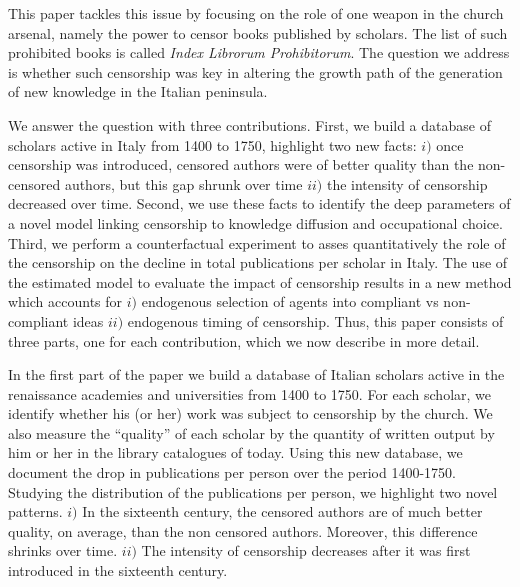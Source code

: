 \documentclass[12pt]{article}
\begin{document}
This paper tackles this issue by focusing on the role of one weapon in the church arsenal, namely the power to censor books published by scholars. The list of such prohibited books is called {\em Index Librorum Prohibitorum}. The question we address is whether such censorship was key in altering the growth path of the generation of new knowledge in the Italian peninsula.

We answer the question with three contributions. First, we build a database of scholars active in Italy from 1400 to 1750, highlight two new facts: $i)$ once censorship was introduced, censored authors were of better quality than the non-censored authors, but this gap shrunk over time $ii)$ the intensity of censorship decreased over time. Second, we use these facts to identify the deep parameters of a novel model linking censorship to knowledge diffusion and occupational choice. Third, we perform a counterfactual experiment to asses quantitatively the role of the censorship on the decline in total publications per scholar in Italy. The use of the estimated model to evaluate the impact of censorship results in a new method which accounts for $i)$ endogenous selection of agents into compliant vs non-compliant ideas $ii)$ endogenous timing of censorship. Thus, this paper consists of three parts, one for each contribution, which we now describe in more detail.


In the first part of the paper we build a database of Italian scholars active in the renaissance academies and universities from 1400 to 1750. For each scholar, we identify whether his (or her) work was subject to censorship by the church. We also measure the ``quality'' of each scholar by the quantity of written output by him or her in the library catalogues of today. Using this new database, we document the drop in publications per person over the period 1400-1750. Studying the distribution of the publications per person, we highlight two novel  patterns. $i)$ In the sixteenth century, the censored authors are of much better quality, on average, than the non censored authors. Moreover, this difference shrinks over time. $ii)$ The intensity of censorship decreases after it was first introduced in the sixteenth century.
\end{document}
